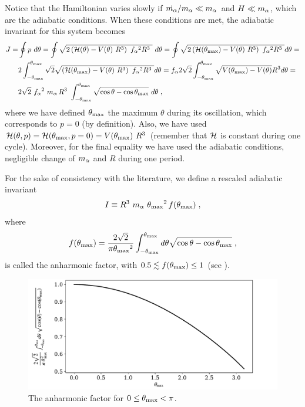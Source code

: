 \documentclass[11pt,a4paper]{article}
\begin{document}
Notice that the Hamiltonian varies slowly if $\dot {m_\alpha{}}/m_\alpha{} \ll m_\alpha{}$ and $H \ll m_\alpha{}$, which are the adiabatic conditions.   When these conditions are met, the adiabatic invariant for this system becomes
%
\begin{eqnarray}
	J = & \oint p \ d \theta = \oint \sqrt{ 2\left(  \mathcal{H}(\theta) - V(\theta) \ R^3 \right) \ f_{\alpha}{}^2 R^3 \ }  \ d \theta  =
	 \oint \sqrt{ 2\left(  \mathcal{H}(\theta_{\rm max}{}) - V(\theta) \ R^3 \right) \ f_{\alpha}{}^2 R^3 \ } d \theta = \nonumber \\ 
	& 2 \int_{- \theta_{\rm max}{}} ^{\theta_{\rm max}{}}  \sqrt{2}\sqrt{ \left(  \mathcal{H}(\theta_{\rm max}{}) - V(\theta) \ R^3 \right) \ f_{\alpha}{}^2 R^3 \ } d \theta =
	f_{\alpha}{} 2 \sqrt{2} \int_{- \theta_{\rm max}{}} ^{\theta_{\rm max}{}}  \sqrt{ V(\theta_{\rm max}) - V(\theta) } R^{3} d \theta = \nonumber \\
	&2\sqrt{2} \ f_{\alpha}{}^2 \ m_\alpha{} \, R^3 \ \displaystyle \int_{- \theta_{\rm max}{}}^{\theta_{\rm max}{}} \sqrt{\cos \theta - \cos \theta_{\rm max}{}} \ d \theta  
	\;,
	\label{eq:J_axion_derivation}
\end{eqnarray}
%
where we have defined $\theta_{\rm max}{}$ the maximum $\theta$ during its oscillation, which corresponds to $p=0$ (by definition). Also, we have used $\mathcal{H}(\theta,p) = \mathcal{H}(\theta_{\rm max}{},p=0) =  V(\theta_{\rm max}{}) \ R^3$ (remember that $\mathcal{H}$ is constant during one cycle). Moreover, for the final equality we have used the adiabatic conditions, \ie negligible change of $m_\alpha{}$ and $R$ during one period.
%

For the sake of consistency with the literature, we define a rescaled adiabatic invariant 
%
\begin{equation}
	I \equiv R^3 \ \ma \ \thetamax^2  \, f(\thetamax)  \;,
	\label{eq:J_axion_def}
\end{equation}
%
where 
\begin{equation}
	f(\theta_{\rm max}{}) =\dfrac{ 2 \sqrt{2}}{\pi \theta_{\rm max}{}^2 } \displaystyle \int_{- \theta_{\rm max}{}}^{\theta_{\rm max}{}} d \theta \sqrt{ \cos \theta - \cos \theta_{\rm max}{} } \;,
	\label{eq:anharmonic_f}
\end{equation}
%
is called the anharmonic factor, with $ 0.5 \lesssim f(\theta_{\rm max}{}) \leq 1$ (see ).


\begin{figure}[t]
	\includegraphics[width=1\textwidth]{figs/anharmonic_factor.pdf}
	\caption{The anharmonic factor for $0 \leq \theta_{\rm max}{} < \pi $.}
	\label{fig:anharmonic_factor}
\end{figure}
\end{document}

